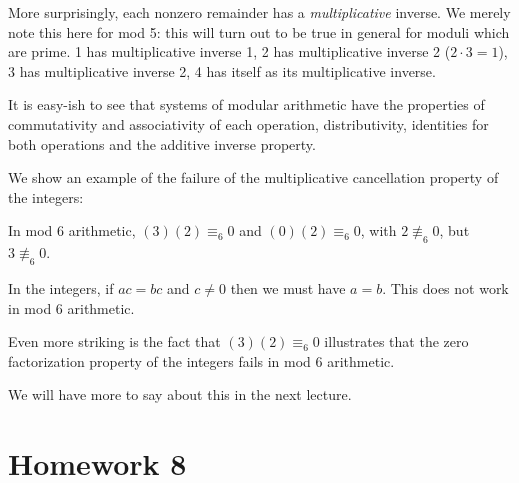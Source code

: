 \documentclass[12pt]{article}
\begin{document}
More surprisingly, each nonzero remainder has a {\em multiplicative\/} inverse.  We merely note this here for mod 5:  this will turn out to be true in general for moduli which are prime.  1 has multiplicative inverse 1, 2 has multiplicative inverse 2 ($2\cdot 3 = 1$), 3 has multiplicative inverse 2, 4 has itself as its multiplicative inverse.

It is easy-ish to see that systems of modular arithmetic have the properties of commutativity and associativity of each operation, distributivity, identities for both operations and the additive inverse property.

We show an example of the failure of the multiplicative cancellation property of the integers:

In mod 6 arithmetic, $(3)(2) \equiv_6 0$ and $(0)(2) \equiv_6 0$, with $2 \not\equiv_6 0$, but $3 \not\equiv_6 0$.

In the integers, if $ac= bc$ and $c \neq 0$ then we must have $a=b$.  This does not work in mod 6 arithmetic.

Even more striking is the fact that $(3)(2) \equiv_6 0$ illustrates that the zero factorization property of the integers fails in mod 6 arithmetic.

We will have more to say about this in the next lecture.

\section{Homework 8}
\end{document}

